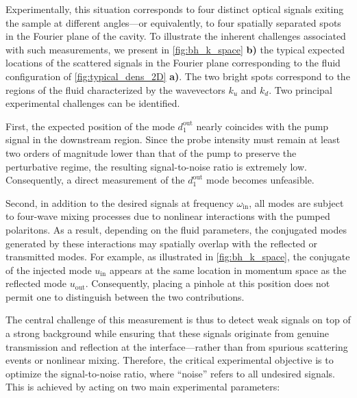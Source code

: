 \bigskip


Experimentally, this situation corresponds to four distinct optical signals exiting the sample at different angles—or equivalently, to four spatially separated spots in the Fourier plane of the cavity. To illustrate the inherent challenges associated with such measurements, we present in \autoref{fig:bh_k_space} \textbf{b)} the typical expected locations of the scattered signals in the Fourier plane corresponding to the fluid configuration of \autoref{fig:typical_dens_2D} \textbf{a)}. The two bright spots correspond to the regions of the fluid characterized by the wavevectors \(k_u\) and \(k_d\). Two principal experimental challenges can be identified. 

First, the expected position of the mode \(d_1^{\text{out}}\) nearly coincides with the pump signal in the downstream region. Since the probe intensity must remain at least two orders of magnitude lower than that of the pump to preserve the perturbative regime, the resulting signal-to-noise ratio is extremely low. Consequently, a direct measurement of the \(d_1^{\text{out}}\) mode becomes unfeasible.

Second, in addition to the desired signals at frequency \(\omega_{\text{in}}\), all modes are subject to four-wave mixing processes due to nonlinear interactions with the pumped polaritons. As a result, depending on the fluid parameters, the conjugated modes generated by these interactions may spatially overlap with the reflected or transmitted modes. For example, as illustrated in \autoref{fig:bh_k_space}, the conjugate of the injected mode \(u_{\text{in}}\) appears at the same location in momentum space as the reflected mode \(u_{\text{out}}\). Consequently, placing a pinhole at this position does not permit one to distinguish between the two contributions.

The central challenge of this measurement is thus to detect weak signals on top of a strong background while ensuring that these signals originate from genuine transmission and reflection at the interface—rather than from spurious scattering events or nonlinear mixing. Therefore, the critical experimental objective is to optimize the signal-to-noise ratio, where “noise” refers to all undesired signals. This is achieved by acting on two main experimental parameters:


